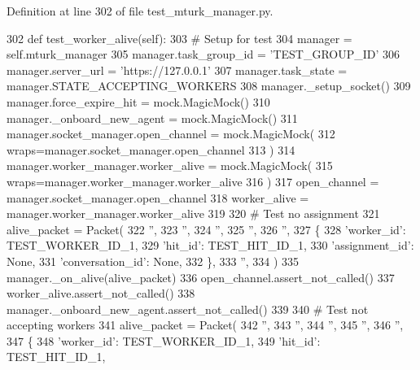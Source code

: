Definition at line 302 of file test\+\_\+mturk\+\_\+manager.\+py.


\begin{DoxyCode}
302     \textcolor{keyword}{def }test\_worker\_alive(self):
303         \textcolor{comment}{# Setup for test}
304         manager = self.mturk\_manager
305         manager.task\_group\_id = \textcolor{stringliteral}{'TEST\_GROUP\_ID'}
306         manager.server\_url = \textcolor{stringliteral}{'https://127.0.0.1'}
307         manager.task\_state = manager.STATE\_ACCEPTING\_WORKERS
308         manager.\_setup\_socket()
309         manager.force\_expire\_hit = mock.MagicMock()
310         manager.\_onboard\_new\_agent = mock.MagicMock()
311         manager.socket\_manager.open\_channel = mock.MagicMock(
312             wraps=manager.socket\_manager.open\_channel
313         )
314         manager.worker\_manager.worker\_alive = mock.MagicMock(
315             wraps=manager.worker\_manager.worker\_alive
316         )
317         open\_channel = manager.socket\_manager.open\_channel
318         worker\_alive = manager.worker\_manager.worker\_alive
319 
320         \textcolor{comment}{# Test no assignment}
321         alive\_packet = Packet(
322             \textcolor{stringliteral}{''},
323             \textcolor{stringliteral}{''},
324             \textcolor{stringliteral}{''},
325             \textcolor{stringliteral}{''},
326             \textcolor{stringliteral}{''},
327             \{
328                 \textcolor{stringliteral}{'worker\_id'}: TEST\_WORKER\_ID\_1,
329                 \textcolor{stringliteral}{'hit\_id'}: TEST\_HIT\_ID\_1,
330                 \textcolor{stringliteral}{'assignment\_id'}: \textcolor{keywordtype}{None},
331                 \textcolor{stringliteral}{'conversation\_id'}: \textcolor{keywordtype}{None},
332             \},
333             \textcolor{stringliteral}{''},
334         )
335         manager.\_on\_alive(alive\_packet)
336         open\_channel.assert\_not\_called()
337         worker\_alive.assert\_not\_called()
338         manager.\_onboard\_new\_agent.assert\_not\_called()
339 
340         \textcolor{comment}{# Test not accepting workers}
341         alive\_packet = Packet(
342             \textcolor{stringliteral}{''},
343             \textcolor{stringliteral}{''},
344             \textcolor{stringliteral}{''},
345             \textcolor{stringliteral}{''},
346             \textcolor{stringliteral}{''},
347             \{
348                 \textcolor{stringliteral}{'worker\_id'}: TEST\_WORKER\_ID\_1,
349                 \textcolor{stringliteral}{'hit\_id'}: TEST\_HIT\_ID\_1,

\end{DoxyCode}
